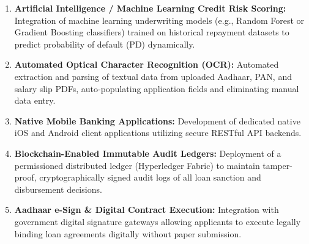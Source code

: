 \begin{enumerate}
  \item \textbf{Artificial Intelligence / Machine Learning Credit Risk Scoring:} Integration of machine learning underwriting models (e.g., Random Forest or Gradient Boosting classifiers) trained on historical repayment datasets to predict probability of default (PD) dynamically.
  \item \textbf{Automated Optical Character Recognition (OCR):} Automated extraction and parsing of textual data from uploaded Aadhaar, PAN, and salary slip PDFs, auto-populating application fields and eliminating manual data entry.
  \item \textbf{Native Mobile Banking Applications:} Development of dedicated native iOS and Android client applications utilizing secure RESTful API backends.
  \item \textbf{Blockchain-Enabled Immutable Audit Ledgers:} Deployment of a permissioned distributed ledger (Hyperledger Fabric) to maintain tamper-proof, cryptographically signed audit logs of all loan sanction and disbursement decisions.
  \item \textbf{Aadhaar e-Sign \& Digital Contract Execution:} Integration with government digital signature gateways allowing applicants to execute legally binding loan agreements digitally without paper submission.
\end{enumerate}
